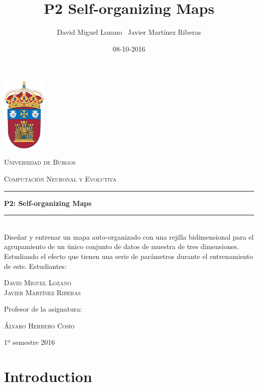 \documentclass[a4paper,12pt,titlepage]{article}
\newcommand{\HRule}[1]{\rule{\linewidth}{#1}}
\begin{document}
\author{David Miguel Lozano \ Javier Martínez Riberas}
\title{P2 Self-organizing Maps}
\date{08-10-2016}

\begin{titlepage}
	\centering
	\includegraphics[width=0.16\textwidth]{ubu-logo.png}\par
	\vspace{0.3cm}
	{\scshape\LARGE Universidad de Burgos \par}
	\vfill
	{\scshape\Large Computación Neuronal y Evolutiva \par}
	\HRule{2pt}
	{\huge\bfseries P2: Self-organizing Maps \par}
	\HRule{2pt}
	\\ [0.5cm]
	{Diseñar y entrenar un mapa auto-organizado con una rejilla bidimensional para el agrupamiento de un único conjunto de datos de muestra de tres dimensiones. Estudiando el efecto que tienen una serie de parámetros durante el entrenamiento de este.}
	\vfill
	Estudiantes:\par
	{\Large\scshape David Miguel Lozano \\ Javier Martínez Riberas \par}
	\vfill
	Profesor de la asignatura:\par
	\textsc{Álvaro Herrero Cosío}
	\vfill
	{\large 1º semestre 2016 \par}
\end{titlepage}

\newpage
\tableofcontents
\begin{appendix}
\end{appendix}

\newpage

\section{Introduction}
\end{document}
